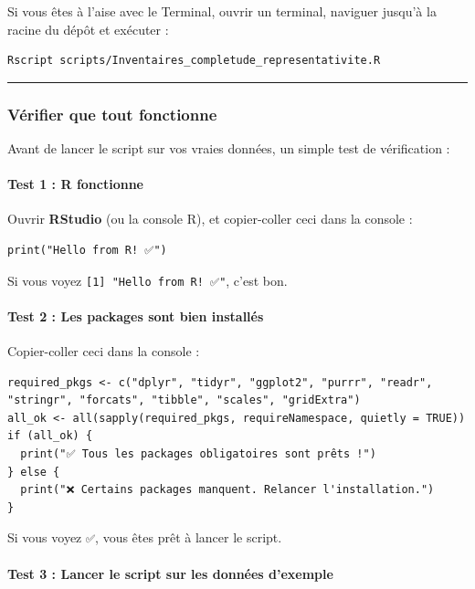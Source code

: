 Si vous êtes à l'aise avec le Terminal, ouvrir un terminal, naviguer
jusqu'à la racine du dépôt et exécuter :

\begin{verbatim}
Rscript scripts/Inventaires_completude_representativite.R
\end{verbatim}

\begin{center}\rule{0.5\linewidth}{0.5pt}\end{center}

\subsubsection{Vérifier que tout
fonctionne}\label{vuxe9rifier-que-tout-fonctionne}

Avant de lancer le script sur vos vraies données, un simple test de
vérification :

\paragraph{Test 1 : R fonctionne}\label{test-1-r-fonctionne}

Ouvrir \textbf{RStudio} (ou la console R), et copier-coller ceci dans la
console :

\begin{verbatim}
print("Hello from R! ✅")
\end{verbatim}

Si vous voyez \texttt{{[}1{]}\ "Hello\ from\ R!\ ✅"}, c'est bon.

\paragraph{Test 2 : Les packages sont bien
installés}\label{test-2-les-packages-sont-bien-installuxe9s}

Copier-coller ceci dans la console :

\begin{verbatim}
required_pkgs <- c("dplyr", "tidyr", "ggplot2", "purrr", "readr", "stringr", "forcats", "tibble", "scales", "gridExtra")
all_ok <- all(sapply(required_pkgs, requireNamespace, quietly = TRUE))
if (all_ok) {
  print("✅ Tous les packages obligatoires sont prêts !")
} else {
  print("❌ Certains packages manquent. Relancer l'installation.")
}
\end{verbatim}

Si vous voyez \texttt{✅}, vous êtes prêt à lancer le script.

\paragraph{Test 3 : Lancer le script sur les données
d'exemple}\label{test-3-lancer-le-script-sur-les-donnuxe9es-dexemple}

